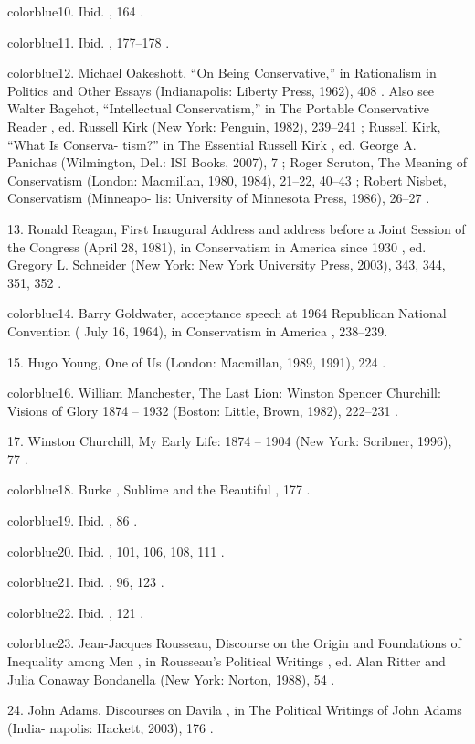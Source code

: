 	{color{blue}10}. Ibid. , 164 .


	{color{blue}11}. Ibid. , 177–178 .


	{color{blue}12}. Michael Oakeshott, “On Being Conservative,” in Rationalism in Politics and Other Essays (Indianapolis: Liberty Press, 1962), 408 . Also see Walter Bagehot, “Intellectual Conservatism,” in The Portable Conservative Reader , ed. Russell Kirk (New York: Penguin, 1982), 239–241 ; Russell Kirk, “What Is Conserva- tism?” in The Essential Russell Kirk , ed. George A. Panichas (Wilmington, Del.: ISI Books, 2007), 7 ; Roger Scruton, The Meaning of Conservatism (London: Macmillan, 1980, 1984), 21–22, 40–43 ; Robert Nisbet, Conservatism (Minneapo- lis: University of Minnesota Press, 1986), 26–27 .


	{\color{blue}13}. Ronald Reagan, First Inaugural Address and address before a Joint Session of the Congress (April 28, 1981), in Conservatism in America since 1930 , ed. Gregory L. Schneider (New York: New York University Press, 2003), 343, 344, 351, 352 .


	{color{blue}14}. Barry Goldwater, acceptance speech at 1964 Republican National Convention ( July 16, 1964), in Conservatism in America , 238–239.


	{\color{blue}15}. Hugo Young, One of Us (London: Macmillan, 1989, 1991), 224 .


	{color{blue}16}. William Manchester, The Last Lion: Winston Spencer Churchill: Visions of Glory 1874 – 1932 (Boston: Little, Brown, 1982), 222–231 .


	{\color{blue}17}. Winston Churchill, My Early Life: 1874 – 1904 (New York: Scribner, 1996), 77 .


	{color{blue}18}. Burke , Sublime and the Beautiful , 177 .


	{color{blue}19}. Ibid. , 86 .


	{color{blue}20}. Ibid. , 101, 106, 108, 111 .


	{color{blue}21}. Ibid. , 96, 123 .


	{color{blue}22}. Ibid. , 121 .


	{color{blue}23}. Jean-Jacques Rousseau, Discourse on the Origin and Foundations of Inequality among Men , in Rousseau’s Political Writings , ed. Alan Ritter and Julia Conaway Bondanella (New York: Norton, 1988), 54 .


	{\color{blue}24}. John Adams, Discourses on Davila , in The Political Writings of John Adams (India- napolis: Hackett, 2003), 176 .


